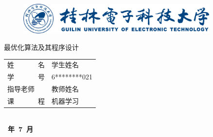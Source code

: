 
\begin{titlepage}
	\begin{center}
		\begin{figure}[!ht]\vspace{-1em}
			\centering
 			\includegraphics[width=0.90\textwidth]{figures/桂电标志.png}
			\vspace{3em}\\

		\end{figure}
		
		
		\vspace{5em}
		\begin{center} {\erhao\hei 最优化算法及其程序设计}\end{center}
		
		\vspace{1em}
		{\sanhao
			\begin{center} \renewcommand{\arraystretch}{1.7}
				\begin{tabular}{l@{：}l}
					姓~~~~~~~名 & 学生姓名 \\
					学~~~~~~~号 & 6********021 \\
					指导老师    & 教师姓名 \\
					课~~~~~~~程 & 机器学习
				\end{tabular} \renewcommand{\arraystretch}{1}\\
				\vspace{8em}
				\textbf{~年~7~月} \\
			\end{center} 
		}
	\end{center}
	

\end{titlepage}
